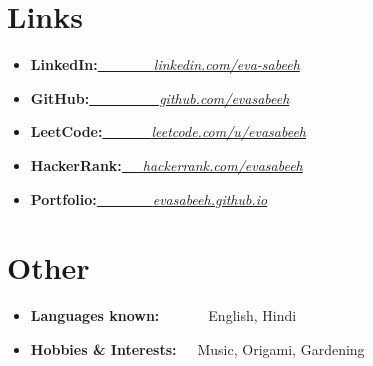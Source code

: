 \documentclass[a4paper,20pt]{article}
\newcommand{\resumeSimpleItem}[2]{
  \item\small{
    {#1}{#2 \vspace{-2pt}}
  }
}
\newcommand{\resumeSimpleSubItem}[2]{\resumeSimpleItem{#1}{#2}\vspace{-3pt}}
\newcommand{\resumeSubHeadingSimpleListStart}{\begin{itemize}[leftmargin=*]}
\newcommand{\resumeSubHeadingSimpleListEnd}{\end{itemize}}
\begin{document}
\section{Links}
\resumeSubHeadingSimpleListStart
\resumeSimpleSubItem{\textbf{LinkedIn:}}{\href{https://www.linkedin.com/in/eva-sabeeh/}{~~~~~~~~\emph{linkedin.com/eva-sabeeh}}}
\vspace{-1pt}
\resumeSimpleSubItem{\textbf{GitHub:}}{\href{https://www.github.com/evasabeeh/}{~~~~~~~~~~\emph{github.com/evasabeeh}}}
\vspace{-1pt}
\resumeSimpleSubItem{\textbf{LeetCode:}}{\href{https://www.leetcode.com/u/evasabeeh/}{~~~~~~~\emph{leetcode.com/u/evasabeeh}}}
\vspace{-1pt}
\resumeSimpleSubItem{\textbf{HackerRank:}}{\href{https://www.hackerrank.com/profile/evasabeeh}{~~~\emph{hackerrank.com/evasabeeh}}}
\vspace{-1pt}
\resumeSimpleSubItem{\textbf{Portfolio:}}{\href{https://evasabeeh.github.io/}{~~~~~~~~\emph{evasabeeh.github.io}}}
\vspace{-1pt}
\resumeSubHeadingSimpleListEnd
\vspace{2pt}



\section{Other}
\resumeSubHeadingSimpleListStart
\resumeSimpleSubItem {\textbf{Languages known:}}{~~~~~~~English, Hindi}
\vspace{-1pt}
\resumeSimpleSubItem{\textbf{Hobbies \& Interests:}}{~~~Music, Origami, Gardening}
\resumeSubHeadingSimpleListEnd
\vspace{2pt}
\end{document}
